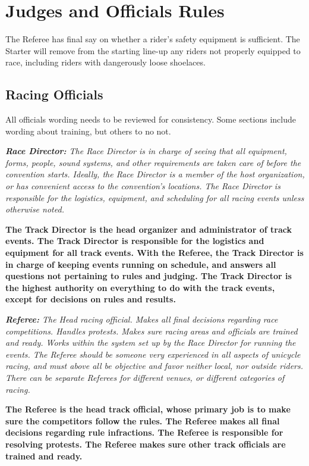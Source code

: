 \chapter{Judges and Officials Rules}

The Referee has final say on whether a rider’s safety equipment is sufficient. The Starter will remove from the starting line-up any riders not properly equipped to race, including riders with dangerously loose shoelaces. 

\section{Racing Officials}

\begin{framed}
All officials wording needs to be reviewed for consistency.  Some sections
include wording about training, but others to no not.
\end{framed}

\textit{\textbf{Race Director:} The Race Director is in charge of seeing that all equipment, forms, people, sound systems, and other requirements are taken care of before the convention starts.
Ideally, the Race Director is a member of the host organization, or has convenient access to the convention's locations.
The Race Director is responsible for the logistics, equipment, and scheduling for all racing events unless otherwise noted.}

\textbf{The Track Director is the head organizer and administrator of track events.  The Track Director is responsible for the logistics and
equipment for all track events.  With the Referee, the
Track Director is in charge of keeping events running on schedule, and
answers all questions not pertaining to rules and judging.  The Track
Director is the highest authority on everything to do with the track
events, except for decisions on rules and results.}

\textit{\textbf{Referee:} The Head racing official.
Makes all final decisions regarding race competitions.
Handles protests.
Makes sure racing areas and officials are trained and ready.
Works within the system set up by the Race Director for running the events.
The Referee should be someone very experienced in all aspects of unicycle racing, and must above all be objective and favor neither local, nor outside riders.
There can be separate Referees for different venues, or different categories of racing.}

\textbf{The Referee is the head track official, whose primary job is to make sure
the competitors follow the rules.  The Referee makes all final decisions
regarding rule infractions. The Referee is responsible for resolving
protests. The Referee makes sure other track officials are trained and ready.}

